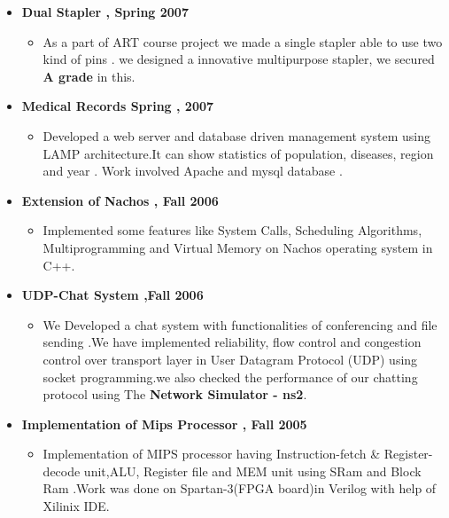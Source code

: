 \documentclass[margin]{res}
\makeatletter
\newcommand{\resitem}[1]{\item #1 \vspace{-2pt}}
\newcommand{\ressubheading}[4]{
\begin{tabular*}{6.5in}{l@{\extracolsep{\fill}}r}
		\textbf{#1} & #2 \\
		\textit{#3} & \textit{#4} \\
\end{tabular*}\vspace{-6pt}}
\makeatother
\begin{document}
\begin{itemize}
		\vspace{-0.1in}
			\item \textbf{Dual Stapler , Spring 2007}	
		\vspace{-0.1in}
		\begin{itemize}
		\resitem{As a part of ART course project we made a single stapler able to use two kind of pins . we  designed a innovative multipurpose stapler, we secured \textbf{A grade} in this.}
		\end{itemize}	
		\vspace{-0.1in}
			\item \textbf{Medical Records Spring , 2007}
		\vspace{-0.1in}
		\begin{itemize}
		\resitem{ Developed a web server and database driven management system  using LAMP architecture.It can show statistics of population, diseases, region and  year . Work involved Apache  and mysql database .}
	
		\end{itemize}	
		\vspace{-0.1in}
\item \textbf{Extension of Nachos , Fall 2006}
		\vspace{-0.1in}
		\begin{itemize}
		\resitem{Implemented some features like System Calls, Scheduling Algorithms, Multiprogramming and Virtual Memory on Nachos  operating system in C++.}
		\end{itemize}
	
	
\vspace{-0.1in}	
\item \textbf{UDP-Chat System ,Fall 2006}	
		\vspace{-0.1in}
		\begin{itemize}
		\resitem{We Developed a chat system with functionalities of conferencing and file sending .We have implemented reliability, flow control and congestion control over transport layer in User Datagram Protocol (UDP) using socket programming.we also checked the performance of our chatting protocol using The \textbf{Network Simulator - ns2}.}
		\end{itemize}
		
\vspace{-0.1in}
\item	\textbf{Implementation of Mips Processor , Fall 2005}
		\begin{itemize}
		\vspace{-0.1in}
		\resitem{Implementation of MIPS processor having Instruction-fetch \& Register-decode unit,ALU, Register file and MEM unit using SRam and Block Ram .Work was done on Spartan-3(FPGA board)in Verilog with help of Xilinix IDE.}
	

\end{itemize}
\end{itemize}
\end{document}
